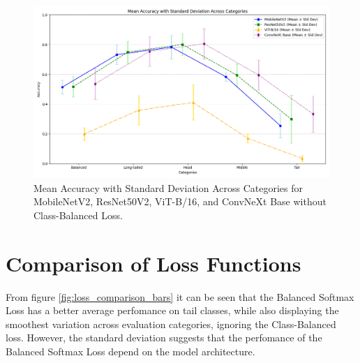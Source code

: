 \begin{figure}[h!]
    \centering
    \includegraphics[width=\textwidth]{Images/Plots/mean_loss_comparison_noCB.png}
    \caption{Mean Accuracy with Standard Deviation Across Categories for MobileNetV2, ResNet50V2, ViT-B/16, and ConvNeXt Base without Class-Balanced Loss.}
    \label{fig:mean_loss_comparison_line_noCB}
\end{figure}



\section{Comparison of Loss Functions}

From figure \ref{fig:loss_comparison_bars} it can be seen that the Balanced Softmax Loss has a better average perfomance on tail classes, while also displaying the smoothest variation across evaluation categories, ignoring the Class-Balanced loss. However, the standard deviation suggests that the perfomance of the Balanced Softmax Loss depend on the model architecture.



